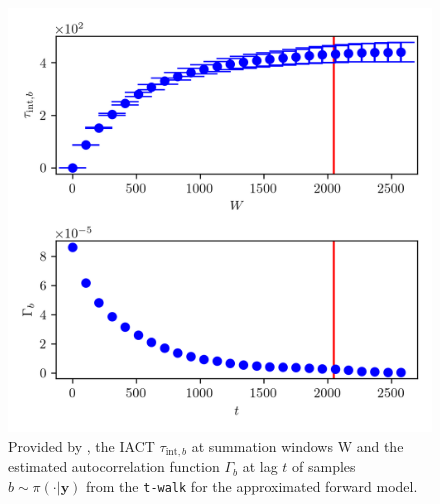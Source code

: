 \begin{figure}[ht!]
	\centering
	\includegraphics{UwerrTauIntTWalk2.png}
	\caption[IACT and autocorrelation function of samples $b \sim \pi(\cdot|\bm{y})$, for approximated model.]{Provided by \cite{drikHesse}, the IACT $\tau_{\text{int},b}$ at summation windows W and the estimated autocorrelation function $\Gamma_{b}$ at lag $t$ of samples $b \sim \pi( \cdot| \bm{y})$ from the \texttt{t-walk} for the approximated forward model.}
	\label{fig:TWalkIATC3}
\end{figure}


